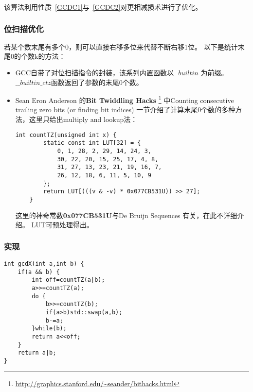 该算法利用性质~\ref{GCDC1}与~\ref{GCDC2}对更相减损术进行了优化。

\subsubsection{位扫描优化}

若某个数末尾有多个0，则可以直接右移多位来代替不断右移1位。
以下是统计末尾0的个数k的方法：

\begin{itemize}
	\item GCC自带了对位扫描指令的封装，该系列内置函数以$\_\_builtin\_$为前缀。\\
	      $\_\_builtin\_ctz$函数返回了参数的末尾0个数。
	\item Sean Eron Anderson 的{\bfseries Bit Twiddling Hacks}
	      \footnote{\url{http://graphics.stanford.edu/~seander/bithacks.html}}
	      中Counting consecutive trailing zero bits (or finding bit indices)
	      一节介绍了计算末尾0个数的多种方法，这里只给出multiply and lookup法：
	      \begin{lstlisting}[title=countTZ]
    int countTZ(unsigned int x) {
        static const int LUT[32] = {
            0, 1, 28, 2, 29, 14, 24, 3,
            30, 22, 20, 15, 25, 17, 4, 8,
            31, 27, 13, 23, 21, 19, 16, 7,
            26, 12, 18, 6, 11, 5, 10, 9
        };
        return LUT[(((v & -v) * 0x077CB531U)) >> 27];
    }
    \end{lstlisting}
	      这里的神奇常数{\bfseries 0x077CB531U}与De Bruijn Sequences
	      有关，在此不详细介绍。
	      LUT可预处理得出。
\end{itemize}

\subsubsection{实现}
\begin{lstlisting}[title=gcdX]
int gcdX(int a,int b) {
    if(a && b) {
        int off=countTZ(a|b);
        a>>=countTZ(a);
        do {
            b>>=countTZ(b);
            if(a>b)std::swap(a,b);
            b-=a;
        }while(b);
        return a<<off;
    }
    return a|b;
}
\end{lstlisting}
